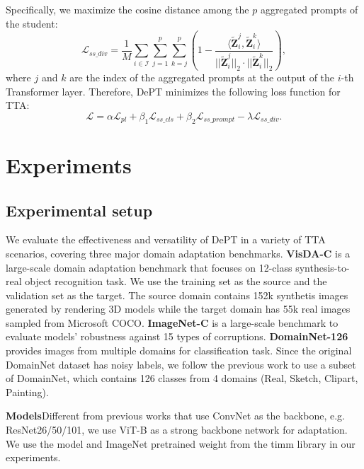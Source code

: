 \documentclass{article} \usepackage{iclr2023_conference,times}
\def\mZ{{\bm{Z}}}
\begin{document}
Specifically, we maximize the cosine distance among the $p$ aggregated prompts of the student:
\begin{equation}
    \mathcal{L}_{ss\_div}= \frac{1}{M}\sum_{i\in \mathcal{I}}\sum_{j=1}^p \sum_{k=j}^p\left(1-\frac{\langle \tilde{\displaystyle \mZ}_i^j, \tilde{\displaystyle \mZ}_i^k \rangle}{ ||\tilde{\displaystyle \mZ}_i^j||_2 \cdot ||\tilde{\displaystyle \mZ}_i^k ||_2} \right),
\end{equation}
where $j$ and $k$ are the index of the aggregated prompts at the output of the $i$-th Transformer layer. Therefore, DePT minimizes the following loss function for TTA:
\begin{equation}
    \mathcal{L}=\alpha\mathcal{L}_{pl} + \beta_1\mathcal{L}_{ss\_cls} + \beta_2\mathcal{L}_{ss\_prompt} - \lambda \mathcal{L}_{ss\_div} \label{loss}.
\end{equation}






\section{Experiments}


\subsection{Experimental setup}
We evaluate the effectiveness and versatility of DePT in a variety of TTA scenarios, covering three major domain adaptation benchmarks. \textbf{VisDA-C} \citep{visda2017} is a large-scale domain adaptation benchmark that focuses on 12-class synthesis-to-real object recognition task. We use the training set as the source and the validation set as the target. The source domain contains 152k synthetis images generated by rendering 3D models while the target domain has 55k real images sampled from Microsoft COCO. \textbf{ImageNet-C} \citep{hendrycks2019benchmarking} is a large-scale benchmark to evaluate models' robustness against 15 types of corruptions. \textbf{DomainNet-126} \citep{peng2019moment} provides images from multiple domains for classification task. Since the original DomainNet dataset has noisy labels, we follow the previous work \citep{saito2019semi,chen2022contrastive} to use a subset of DomainNet, which contains 126 classes from 4 domains (Real, Sketch, Clipart, Painting).

\textbf{Models}\quad Different from previous works that use ConvNet as the backbone, e.g. ResNet26/50/101, we use ViT-B as a strong backbone network for adaptation. We use the model and ImageNet pretrained weight from the timm library \citep{rw2019timm} in our experiments.
\end{document}
